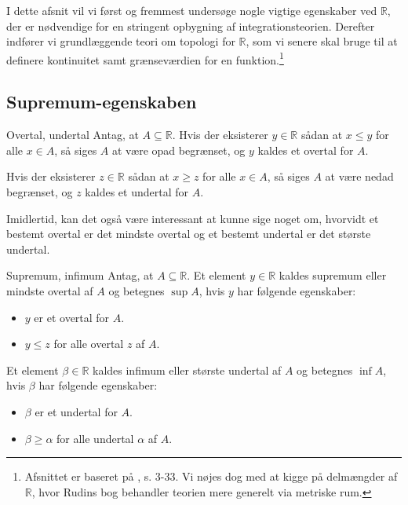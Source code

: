 I dette afsnit vil vi først og fremmest undersøge nogle vigtige egenskaber ved $\mathbb{R}$, der er nødvendige for en stringent opbygning af integrationsteorien.
Derefter indfører vi grundlæggende teori om topologi for $\mathbb{R}$, som vi senere skal bruge til at definere kontinuitet samt grænseværdien for en funktion.\footnote{Afsnittet er baseret på \cite{Rudin1976}, s. 3-33. Vi nøjes dog med at kigge på delmængder af $\mathbb{R}$, hvor Rudins bog behandler teorien mere generelt via metriske rum.}

\subsection{Supremum-egenskaben}%
  \label{sub:Supremum-egenskaben}

\begin{definition}[label=def:overtal]{Overtal, undertal}{}
  Antag, at $A \subseteq \mathbb{R}$. 
  Hvis der eksisterer $y \in \mathbb{R}$ sådan at $x \leq y$ for alle $x \in A$, så siges $A$ at være opad begrænset, og $y$ kaldes et overtal for $A$. 

  Hvis der eksisterer $z \in \mathbb{R}$ sådan at $x \geq z$ for alle $x \in A$, så siges $A$ at være nedad begrænset, og $z$ kaldes et undertal for $A$. 
\end{definition}

Imidlertid, kan det også være interessant at kunne sige noget om, hvorvidt et bestemt overtal er det mindste overtal og et bestemt undertal er det største undertal.

\begin{definition}[label=def:sup]{Supremum, infimum}{}
  Antag, at $A \subseteq \mathbb{R}$. Et element $y \in \mathbb{R}$ kaldes supremum eller mindste overtal af $A$ og betegnes $\sup A$, hvis $y$ har følgende egenskaber:
  \begin{itemize}
    \item $y$ er et overtal for $A$.
    \item $y \leq z$ for alle overtal $z$ af $A$. 
  \end{itemize}
  Et element $\beta \in \mathbb{R}$ kaldes infimum eller største undertal af $A$ og betegnes $\inf A$, hvis $\beta$ har følgende egenskaber:
  \begin{itemize}
    \item $\beta$ er et undertal for $A$.
    \item $\beta \geq \alpha$ for alle undertal $\alpha$ af $A$. 
  \end{itemize}
\end{definition}

